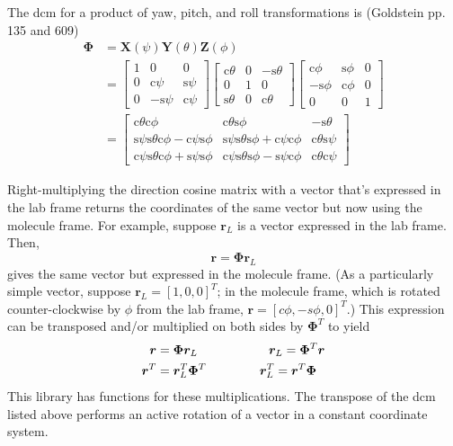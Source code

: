 \documentclass[11pt]{article}
\begin{document}
The dcm for a product of yaw, pitch, and roll transformations is (Goldstein pp. 135 and 609)
\begin{align}
\bm{\Phi} &= \bm{X}(\psi) \bm{Y}(\theta) \bm{Z}(\phi) \nonumber \\
&= \left[ \begin{array}{ccc} 1 & 0 & 0 \\ 0 & \textrm{c} \psi & \textrm{s} \psi \\ 0 & -\textrm{s} \psi & \textrm{c} \psi \end{array} \right]
\left[ \begin{array}{ccc} \textrm{c} \theta & 0 & -\textrm{s} \theta \\ 0 & 1 & 0 \\ \textrm{s} \theta & 0 & \textrm{c} \theta \end{array} \right]
\left[ \begin{array}{ccc} \textrm{c} \phi & \textrm{s} \phi & 0 \\ -\textrm{s} \phi & \textrm{c} \phi & 0 \\ 0 & 0 & 1 \end{array} \right] \nonumber \\
&= \left[ \begin{array}{ccc} \textrm{c} \theta \textrm{c} \phi & \textrm{c} \theta \textrm{s} \phi & -\textrm{s} \theta \\ \textrm{s} \psi \textrm{s} \theta \textrm{c} \phi - \textrm{c} \psi \textrm{s} \phi & \textrm{s} \psi \textrm{s} \theta \textrm{s} \phi + \textrm{c} \psi \textrm{c} \phi & \textrm{c} \theta \textrm{s} \psi \\ \textrm{c} \psi \textrm{s} \theta \textrm{c} \phi + \textrm{s} \psi \textrm{s} \phi & \textrm{c} \psi \textrm{s} \theta \textrm{s} \phi - \textrm{s} \psi \textrm{c} \phi & \textrm{c} \theta \textrm{c} \psi \end{array} \right]
\label{eq:CoordinateRotationYPR}
\end{align}

Right-multiplying the direction cosine matrix with a vector that's expressed in the lab frame returns the coordinates of the same vector but now using the molecule frame. For example, suppose $\bm{r}_L$ is a vector expressed in the lab frame. Then,
\begin{equation}
\bm{r} = \bm{\Phi} \bm{r}_L
\end{equation}
gives the same vector but expressed in the molecule frame. (As a particularly simple vector, suppose $\bm{r}_L=[1,0,0]^T$; in the molecule frame, which is rotated counter-clockwise by $\phi$ from the lab frame, $\bm{r} = [c \phi,- s\phi, 0]^T$.) This expression can be transposed and/or multiplied on both sides by $\bm{\Phi}^T$ to yield
\begin{align}
\bm{r} &= \bm{\Phi} \bm{r}_L \hspace{2cm} \bm{r}_L = \bm{\Phi}^T \bm{r} \\
\bm{r}^T &= \bm{r}_L^T \bm{\Phi}^T \hspace{1.5cm} \bm{r}_L^T = \bm{r}^T \bm{\Phi}
\end{align}
This library has functions for these multiplications. The transpose of the dcm listed above performs an active rotation of a vector in a constant coordinate system.
\end{document}
